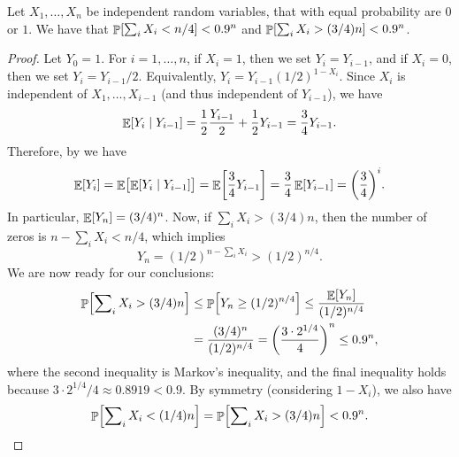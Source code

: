 

\begin{lemma}
    Let $X_1, \ldots, X_n$ be independent random variables, that with
    equal probability are $0$ or $1$.  We have that
    $\Prob{ \sum_i X_i < n/4} < 0.9^n$ and
    $\Prob{ \sum_i X_i > (3/4) n} < 0.9^n$.
\end{lemma} 
\begin{proof}
    Let $Y_0 = 1$. For $i = 1, \ldots, n$, if $X_i = 1$, then we set
    $Y_i = Y_{i-1}$, and if $X_i = 0$, then we set $Y_i = Y_{i-1}/2$.
    Equivalently, $Y_i = Y_{i-1} (1/2)^{1 - X_i}$.
    Since $X_i$ is independent of $X_1, \ldots, X_{i-1}$ (and thus
    independent of $Y_{i-1}$), we have
    \begin{equation*}
        \ExCond{Y_i}{Y_{i-1}}%
        =%
        \frac{1}{2} \frac{Y_{i-1}}{2} +
        \frac{1}{2} Y_{i-1}
        = \frac{3}{4} Y_{i-1}.
    \end{equation*}
    Therefore, by  we have
    \begin{equation*}
        \Ex{Y_i}%
        =%
        \Ex{ \bigl. \ExCond{Y_i}{Y_{i-1}}}
        =%
        \Ex{ \frac{3}{4} Y_{i-1}}%
        =%
        \frac{3}{4}\Ex{  Y_{i-1}}%
        =%
        \pth{\frac{3}{4}}^i.
    \end{equation*}
    In particular, $\mathop{\mathbb{E}}\!\left[ {Y_n} \right] = (3/4)^n$.
    Now, if $\sum_i X_i > (3/4) n$, then the number of zeros is
    $n - \sum_i X_i < n/4$, which implies 
    \begin{equation*}
        Y_n = (1/2)^{n - \sum_i X_i} > (1/2)^{n/4}.
    \end{equation*}
    We are now ready for our conclusions:
    \begin{align*}
        \Prob{ \sum\nolimits_i X_i > (3/4) n }
        &\leq%
        \Prob{ Y_n \geq (1/2)^{n/4}}
        \leq%
        \frac{\Ex{Y_n}}{(1/2)^{n/4}} \\
        &=%
        \frac{(3/4)^n}{(1/2)^{n/4}}
        =%
        \pth{\frac{3 \cdot 2^{1/4}}{4}}^n
        \leq
        0.9^n,
    \end{align*}
    where the second inequality is Markov's inequality, and the final
    inequality holds because $3 \cdot 2^{1/4} / 4 \approx 0.8919 < 0.9$.  By
    symmetry (considering $1 - X_i$), we also have
    \begin{equation*}
        \Prob{ \sum\nolimits_i X_i < (1/4) n }
        =%
        \Prob{ \sum\nolimits_i X_i > (3/4) n }
        <%
        0.9^n.
    \end{equation*}
\end{proof}


